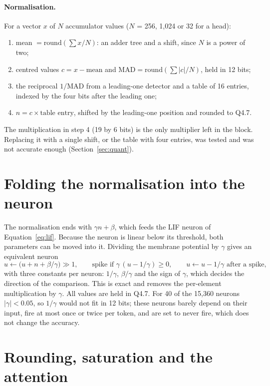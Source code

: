 \paragraph{Normalisation.} For a vector $x$ of $N$ accumulator values ($N$ = 256, 1{,}024 or 32 for a head):
\begin{enumerate}
  \item mean $= \mathrm{round}(\sum x / N)$: an adder tree and a shift, since $N$ is a power of two;
  \item centred values $c = x - \text{mean}$ and $\mathrm{MAD} = \mathrm{round}(\sum |c| / N)$, held in 12 bits;
  \item the reciprocal $1/\mathrm{MAD}$ from a leading-one detector and a table of 16 entries, indexed by the four
        bits after the leading one;
  \item $n = c \times \text{table entry}$, shifted by the leading-one position and rounded to Q4.7.
\end{enumerate}
The multiplication in step 4 (19 by 6 bits) is the only multiplier left in the block. Replacing it with a single
shift, or the table with four entries, was tested and was not accurate enough (Section~\ref{sec:quant}).

\section{Folding the normalisation into the neuron}

The normalisation ends with $\gamma n + \beta$, which feeds the LIF neuron of Equation~\ref{eq:lif}. Because the
neuron is linear below its threshold, both parameters can be moved into it. Dividing the membrane potential by
$\gamma$ gives an equivalent neuron
\begin{equation}
  u \leftarrow \big(u + n + \beta/\gamma\big) \gg 1, \qquad \text{spike if } \gamma\,(u - 1/\gamma) \ge 0,
  \qquad u \leftarrow u - 1/\gamma \text{ after a spike},
\end{equation}
with three constants per neuron: $1/\gamma$, $\beta/\gamma$ and the sign of $\gamma$, which decides the direction of
the comparison. This is exact and removes the per-element multiplication by $\gamma$. All values are held in Q4.7.
For 40 of the 15{,}360 neurons $|\gamma| < 0.05$, so $1/\gamma$ would not fit in 12 bits; these neurons barely depend on
their input, fire at most once or twice per token, and are set to never fire, which does not change the accuracy.

\section{Rounding, saturation and the attention}

